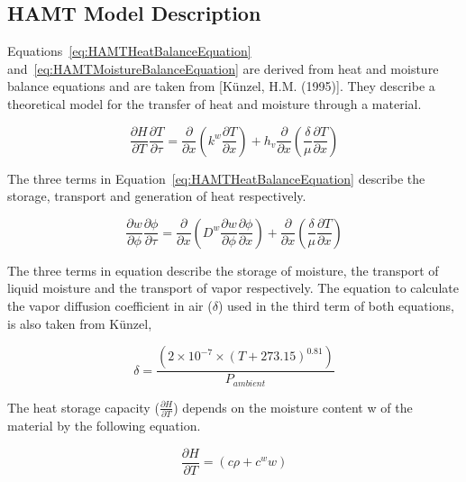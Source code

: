 \subsection{HAMT Model Description}\label{hamt-model-description}

Equations~\ref{eq:HAMTHeatBalanceEquation}
and~\ref{eq:HAMTMoistureBalanceEquation} are derived from heat and moisture
balance equations and are taken from {[}K\"unzel, H.M. (1995){]}. They
describe a theoretical model for the transfer of heat and moisture through
a material.

\begin{equation}
\frac{{\partial H}}{{\partial T}}\frac{{\partial T}}{{\partial \tau }} = \frac{\partial }{{\partial x}}\left( {{k^w}\frac{{\partial T}}{{\partial x}}} \right) + {h_v}\frac{\partial }{{\partial x}}\left( {\frac{\delta }{\mu }\frac{{\partial T}}{{\partial x}}} \right)
\label{eq:HAMTHeatBalanceEquation}
\end{equation}

The three terms in Equation~\ref{eq:HAMTHeatBalanceEquation} describe the
storage, transport and generation of heat respectively.

\begin{equation}
\frac{{\partial w}}{{\partial \phi }}\frac{{\partial \phi }}{{\partial \tau }} = \frac{\partial }{{\partial x}}\left( {{D^w}\frac{{\partial w}}{{\partial \phi }}\frac{{\partial \phi }}{{\partial x}}} \right) + \frac{\partial }{{\partial x}}\left( {\frac{\delta }{\mu }\frac{{\partial T}}{{\partial x}}} \right)
\label{eq:HAMTMoistureBalanceEquation}
\end{equation}

The three terms in equation describe the storage of moisture, the transport
of liquid moisture and the transport of vapor respectively. The equation to
calculate the vapor diffusion coefficient in air (\(\delta\)) used in the
third term of both equations, is also taken from K\"unzel,

\begin{equation}
\delta  = \frac{{\left( {2 \times {{10}^{ - 7}} \times {{\left( {T + 273.15} \right)}^{0.81}}} \right)}}{{{P_{ambient}}}}
\end{equation}

The heat storage capacity (\(\frac{\partial H}{\partial T}\)) depends on the moisture content w of the material by the following equation.

\begin{equation}
\frac{{\partial H}}{{\partial T}} = \left( {c\rho  + {c^w}w} \right)
\end{equation}

